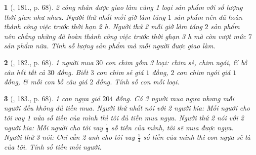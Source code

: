 \documentclass{article}
\newtheorem{baitoan}{}
\begin{document}
\begin{baitoan}[\cite{Tuyen_Toan_9_old}, 181., p. 68]
	2 công nhân được giao làm cùng 1 loại sản phẩm với số lượng thời gian như nhau. Người thứ nhất mỗi giờ làm tăng $1$ sản phẩm nên đã hoàn thành công việc trước thời hạn {\rm2 h}. Người thứ 2 mỗi giờ làm tăng $2$ sản phẩm nên chẳng những đã hoàn thành công việc trước thời ghạn {\rm3 h} mà còn vượt mức $7$ sản phẩm nữa. Tính số lượng sản phẩm mà mỗi người được giao làm.
\end{baitoan}

\begin{baitoan}[\cite{Tuyen_Toan_9_old}, 182., p. 68]
	1 người mua $30$ con chim gồm 3 loại: chim sẻ, chim ngói, \& bồ câu hết tất cả $30$ đồng. Biết $3$ con chim sẻ giá $1$ đồng, $2$ con chim ngói giá $1$ đồng, \& mỗi con bồ câu giá $2$ đồng. Tính số con mỗi loại.
\end{baitoan}

\begin{baitoan}[\cite{Tuyen_Toan_9_old}, 183., p. 68]
	1 con ngựa giá $204$ đồng. Có 3 người mua ngựa nhưng mỗi người đều không đủ tiền mua. Người thứ nhất nói với 2 người kia: Mỗi người cho tôi vay 1 nửa số tiền của mình thì tôi đủ tiền mua ngựa. Người thứ 2 nói với 2 người kia: Mỗi người cho tôi vay $\frac{1}{3}$ số tiền của mình, tôi sẽ mua được ngựa. Người thứ 3 nói: Chỉ cần 2 anh cho tôi vay $\frac{1}{4}$ số tiền của mình thì con ngựa sẽ là của tôi. Tính số tiền mỗi người.
\end{baitoan}


\printbibliography[heading=bibintoc]
	
\end{document}
